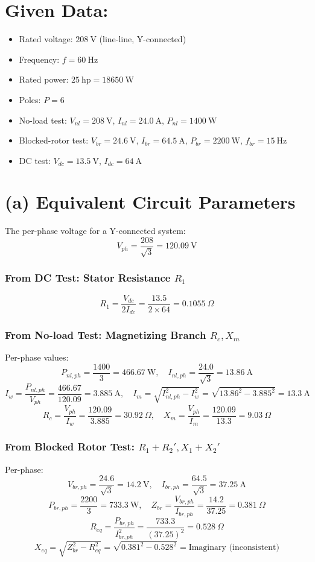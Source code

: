 \documentclass[a4paper,12pt]{article}
\begin{document}
		\section*{Given Data:}
	\begin{itemize}
		\item Rated voltage: $208\ \text{V}$ (line-line, Y-connected)
		\item Frequency: $f = 60\ \text{Hz}$
		\item Rated power: $25\ \text{hp} = 18650\ \text{W}$
		\item Poles: $P = 6$
		\item No-load test: $V_{nl} = 208\ \text{V}$, $I_{nl} = 24.0\ \text{A}$, $P_{nl} = 1400\ \text{W}$
		\item Blocked-rotor test: $V_{br} = 24.6\ \text{V}$, $I_{br} = 64.5\ \text{A}$, $P_{br} = 2200\ \text{W}$, $f_{br} = 15\ \text{Hz}$
		\item DC test: $V_{dc} = 13.5\ \text{V}$, $I_{dc} = 64\ \text{A}$
	\end{itemize}
	
	\section*{(a) Equivalent Circuit Parameters}
	
	The per-phase voltage for a Y-connected system:
	\[
	V_{ph} = \frac{208}{\sqrt{3}} = 120.09\ \text{V}
	\]
	
	\subsubsection*{From DC Test: Stator Resistance \( R_1 \)}
	\[
	R_{1} = \frac{V_{dc}}{2I_{dc}} = \frac{13.5}{2 \times 64} = 0.1055\ \Omega
	\]
	
	\subsubsection*{From No-load Test: Magnetizing Branch \( R_c, X_m \)}
	Per-phase values:
	\[
	P_{nl,ph} = \frac{1400}{3} = 466.67\ \text{W},\quad I_{nl,ph} = \frac{24.0}{\sqrt{3}} = 13.86\ \text{A}
	\]
	\[
	I_w = \frac{P_{nl,ph}}{V_{ph}} = \frac{466.67}{120.09} = 3.885\ \text{A},\quad
	I_m = \sqrt{I_{nl,ph}^2 - I_w^2} = \sqrt{13.86^2 - 3.885^2} = 13.3\ \text{A}
	\]
	\[
	R_c = \frac{V_{ph}}{I_w} = \frac{120.09}{3.885} = 30.92\ \Omega,\quad
	X_m = \frac{V_{ph}}{I_m} = \frac{120.09}{13.3} = 9.03\ \Omega
	\]
	
	\subsubsection*{From Blocked Rotor Test: \( R_1 + R_2', X_1 + X_2' \)}
	Per-phase:
	\[
	V_{br,ph} = \frac{24.6}{\sqrt{3}} = 14.2\ \text{V},\quad I_{br,ph} = \frac{64.5}{\sqrt{3}} = 37.25\ \text{A}
	\]
	\[
	P_{br,ph} = \frac{2200}{3} = 733.3\ \text{W},\quad
	Z_{br} = \frac{V_{br,ph}}{I_{br,ph}} = \frac{14.2}{37.25} = 0.381\ \Omega
	\]
	\[
	R_{eq} = \frac{P_{br,ph}}{I_{br,ph}^2} = \frac{733.3}{(37.25)^2} = 0.528\ \Omega
	\]
	\[
	X_{eq} = \sqrt{Z_{br}^2 - R_{eq}^2} = \sqrt{0.381^2 - 0.528^2} = \text{Imaginary (inconsistent)}
	\]
	
\end{document}
